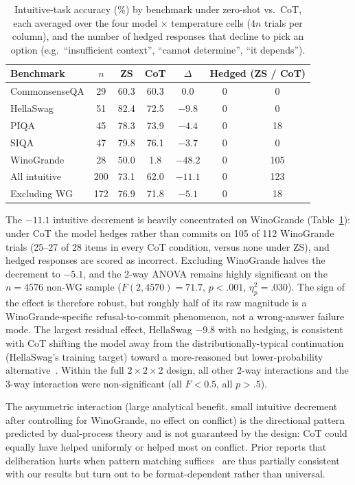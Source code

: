 \documentclass[conference]{IEEEtran}
\begin{document}
\begin{table}[t]
\caption{Intuitive-task accuracy (\%) by benchmark under zero-shot vs.\ CoT, each averaged over the four model $\times$ temperature cells ($4n$ trials per column), and the number of hedged responses that decline to pick an option (e.g.\ ``insufficient context'', ``cannot determine'', ``it depends'').}
\label{tab:winogrande}
\centering
\setlength{\tabcolsep}{4.5pt}
\begin{tabular}{lcccccc}
\toprule
Benchmark & $n$ & ZS & CoT & $\Delta$ & \multicolumn{2}{c}{Hedged (ZS / CoT)} \\
\midrule
CommonsenseQA & 29 & 60.3 & 60.3 & 0.0 & 0 & 0 \\
HellaSwag & 51 & 82.4 & 72.5 & $-9.8$ & 0 & 0 \\
PIQA & 45 & 78.3 & 73.9 & $-4.4$ & 0 & 18 \\
SIQA & 47 & 79.8 & 76.1 & $-3.7$ & 0 & 0 \\
WinoGrande & 28 & 50.0 & 1.8 & $-48.2$ & 0 & 105 \\
\midrule
All intuitive & 200 & 73.1 & 62.0 & $-11.1$ & 0 & 123 \\
Excluding WG & 172 & 76.9 & 71.8 & $-5.1$ & 0 & 18 \\
\bottomrule
\end{tabular}
\end{table}

The $-11.1$ intuitive decrement is heavily concentrated on WinoGrande (Table~\ref{tab:winogrande}): under CoT the model hedges rather than commits on 105 of 112 WinoGrande trials (25--27 of 28 items in every CoT condition, versus none under ZS), and hedged responses are scored as incorrect. Excluding WinoGrande halves the decrement to $-5.1$, and the 2-way ANOVA remains highly significant on the $n=4576$ non-WG sample ($F(2, 4570) = 71.7$, $p < .001$, $\eta^2_p = .030$). The sign of the effect is therefore robust, but roughly half of its raw magnitude is a WinoGrande-specific refusal-to-commit phenomenon, not a wrong-answer failure mode. The largest residual effect, HellaSwag $-9.8$ with no hedging, is consistent with CoT shifting the model away from the distributionally-typical continuation (HellaSwag's training target) toward a more-reasoned but lower-probability alternative~\cite{Liu2024}. Within the full $2 \times 2 \times 2$ design, all other 2-way interactions and the 3-way interaction were non-significant (all $F < 0.5$, all $p > .5$).

The asymmetric interaction (large analytical benefit, small intuitive decrement after controlling for WinoGrande, no effect on conflict) is the directional pattern predicted by dual-process theory and is not guaranteed by the design: CoT could equally have helped uniformly or helped most on conflict. Prior reports that deliberation hurts when pattern matching suffices~\cite{Liu2024} are thus partially consistent with our results but turn out to be format-dependent rather than universal.
\end{document}
